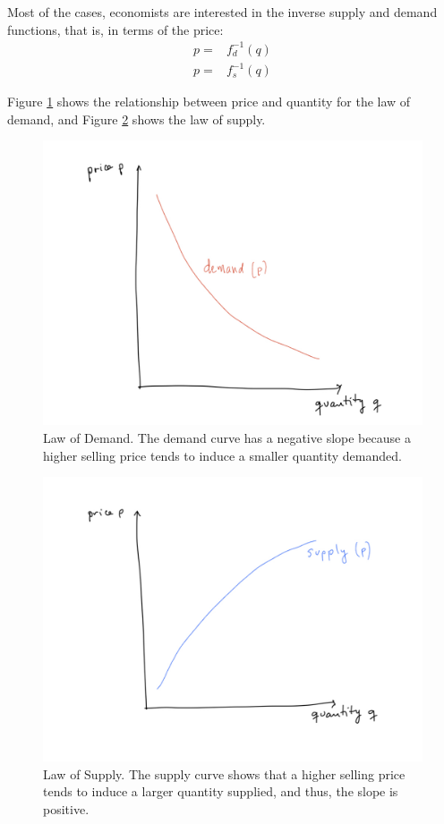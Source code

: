\documentclass[11pt, letterpaper]{article}
\begin{document}
Most of the cases, economists are interested in the inverse supply and demand functions, that is, in terms of the price:
\begin{align}
    p= & f^{-1}_d(q) \\
    p= & f^{-1}_s(q)
\end{align}

Figure \ref{demand} shows the relationship between price and quantity for the law of demand, and Figure \ref{supply} shows the law of supply. 

\begin{figure}[ht!]
  \includegraphics[width=\textwidth]{demand.jpeg}
 \caption{Law of Demand. The demand curve has a negative slope because a higher selling price tends to induce a smaller quantity demanded.}
 \label{demand}
\end{figure}
 
\begin{figure}[ht!]
  \includegraphics[width=\textwidth]{supply.jpeg}
 \caption{Law of Supply. The supply curve shows that a higher selling price tends to induce a larger quantity supplied, and thus, the slope is positive.}
 \label{supply}
 \end{figure}
\end{document}
